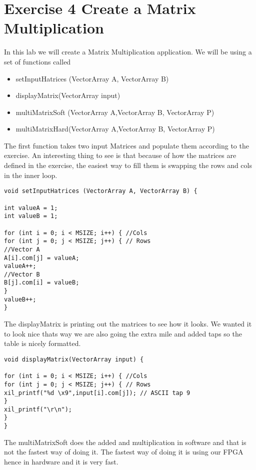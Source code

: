 \section{Exercise 4 Create a Matrix Multiplication}
In this lab we will create a Matrix Multiplication application.
We will be using a set of functions called

\begin{itemize}
	\item setInputHatrices (VectorArray A, VectorArray B)
	\item displayMatrix(VectorArray input)
	\item multiMatrixSoft (VectorArray A,VectorArray B, VectorArray P)
	\item multiMatrixHard(VectorArray A,VectorArray B, VectorArray P)
\end{itemize} 

The first function takes two input Matrices and populate them according to the exercise. An interesting thing to see is that because of how the matrices are defined in the exercise, the easiest way to fill them is  swapping the rows and cols in the inner loop.

\begin{lstlisting}[style=customc++, caption= setInputHatrices ,
label={lst:masterslaveadaptersource}]
void setInputHatrices (VectorArray A, VectorArray B) {

int valueA = 1;
int valueB = 1;

for (int i = 0; i < MSIZE; i++) { //Cols
for (int j = 0; j < MSIZE; j++) { // Rows
//Vector A
A[i].com[j] = valueA;
valueA++;
//Vector B
B[j].com[i] = valueB;
}
valueB++;
}
\end{lstlisting}

The displayMatrix is printing out the matrices to see how it looks. We wanted it to look nice thats way we are also going the extra mile and added taps so the table is nicely formatted.

\begin{lstlisting}[style=customc++, caption= displayMatrix ,
label={lst:masterslaveadaptersource}]
   void displayMatrix(VectorArray input) {

for (int i = 0; i < MSIZE; i++) { //Cols
for (int j = 0; j < MSIZE; j++) { // Rows
xil_printf("%d \x9",input[i].com[j]); // ASCII tap 9
}
xil_printf("\r\n");
}
}
\end{lstlisting}

The multiMatrixSoft does the added and multiplication in software and that is not the fastest way of doing it. The fastest way of doing it is using our FPGA hence in hardware and it is very fast.

